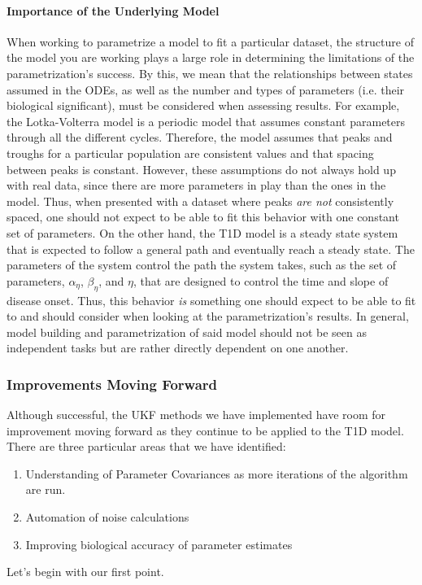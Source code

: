 \documentclass{article}
\begin{document}
\paragraph{Importance of the Underlying Model}
When working to parametrize a model to fit a particular dataset, the structure of the model you are working plays a large role in determining the limitations of the parametrization's success. By this, we mean that the relationships between states assumed in the ODEs, as well as the number and types of parameters (i.e. their biological significant), must be considered when assessing results. For example, the Lotka-Volterra model is a periodic model that assumes constant parameters through all the different cycles. Therefore, the model assumes that peaks and troughs for a particular population are consistent values and that spacing between peaks is constant. However, these assumptions do not always hold up with real data, since there are more parameters in play than the ones in the model. Thus, when presented with a dataset where peaks \emph{are not} consistently spaced, one should not expect to be able to fit this behavior with one constant set of parameters. On the other hand, the T1D model is a steady state system that is expected to follow a general path and eventually reach a steady state. The parameters of the system control the path the system takes, such as the set of parameters, $\alpha_\eta$, $\beta_\eta$, and $\eta$, that are designed to control the time and slope of disease onset. Thus, this behavior \emph{is} something one should expect to be able to fit to and should consider when looking at the parametrization's results. In general, model building and parametrization of said model should not be seen as independent tasks but are rather directly dependent on one another.

\subsubsection{Improvements Moving Forward} \label{section:UKF_FutureImprovements}
Although successful, the UKF methods we have implemented have room for improvement moving forward as they continue to be applied to the T1D model. There are three particular areas that we have identified:
\begin{enumerate}
    \item Understanding of Parameter Covariances as more iterations of the algorithm are run.
    \item Automation of noise calculations
    \item Improving biological accuracy of parameter estimates
\end{enumerate}
Let's begin with our first point.
\end{document}

